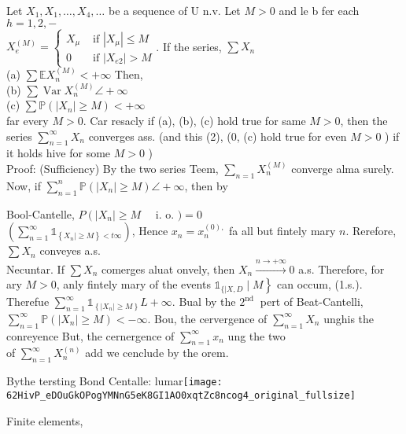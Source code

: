 \documentclass[11pt]{amsbook}
\theoremstyle{plain}%
\theoremstyle{definition}
\theoremstyle{remark}
\begin{document}
Let $X_{1}, X_{1}, \ldots, X_{4}, \ldots$ be a sequence of U n.v. Let $M>0$ and le b fer each $h=1,2,-$\\
$X_{e}^{(M)}=\left\{\begin{array}{ll}X_{\mu} & \text { if }\left|X_{\mu}\right| \leqslant M \\ 0 & \text { if }\left|X_{e 2}\right|>M\end{array}\right.$. If the series, $\sum X_{n}$\\
(a) $\sum \mathbb{E} X_{n}^{(M)}<+\infty$ Then,\\
(b) $\sum \operatorname{Var} X_{n}^{(M)} \angle+\infty$\\
(c) $\sum \mathbb{P}\left(\left|X_{n}\right| \geqslant M\right)<+\infty$\\
far every $M>0$. Car resacly if (a), (b), (c) hold true for same $M>0$, then the series $\sum_{n=1}^{\infty} X_{n}$ converges ass. (and this (2), (0, (c) hold true for even $M>0$ ) if it holds hive for some $M>0$ )\\
Proof: (Sufficiency) By the two series Teem, $\sum_{n=1} X_{n}^{(M)}$ converge alma surely.\\
Now, if $\sum_{n=1}^{n} \mathbb{P}\left(\left|X_{n}\right| \geqslant M\right) \angle+\infty$, then by

Bool-Cantelle, $P\left(\left|X_{n}\right| \geqslant M \quad\right.$ i. o. $)=0$\\
$\left(\sum_{n=1}^{\infty} \mathbb{1}_{\left\{X_{n} \mid \geqslant M\right\}<t \infty}\right)$, Hence $x_{n}=x_{n}^{(0),}$ fa all but fintely mary $n$. Rerefore, $\sum X_{n}$ conveyes a.s.\\
Necuntar. If $\sum X_{n}$ comerges aluat onvely, then $X_{n} \xrightarrow{n \rightarrow+\infty} 0$ a.s. Therefore, for ary $M>0$, anly fintely mary of the events $\left.\mathbb{1}_{\{\mid X, D} \mid M\right\}$ can occum, (1.s.). Therefue $\sum_{n=1}^{\infty} \mathbb{1}_{\left\{\left|X_{n}\right| \geqslant M\right\}} L+\infty$. Bual by the $2^{\text {nd }}$ pert of Beat-Cantelli, $\sum_{n=1}^{\infty} \mathbb{P}\left(\left|X_{n}\right| \geqslant M\right)<-\infty$. Bou, the cervergence of $\sum_{n=1}^{\infty} X_{n}$ unghis the conreyence But, the cernergence of $\sum_{n=1}^{\infty} x_{n}$ ung the two\\
of $\sum_{n=1}^{\infty} X_{n}^{(n)}$ add we cenclude by the orem.

Bythe tersting Bond Centalle: lumar\texttt{[image: 62HivP\_eDOuGkOPogYMNnG5eK8GI1AO0xqtZc8ncog4\_original\_fullsize]}

Finite elements,
\end{document}
